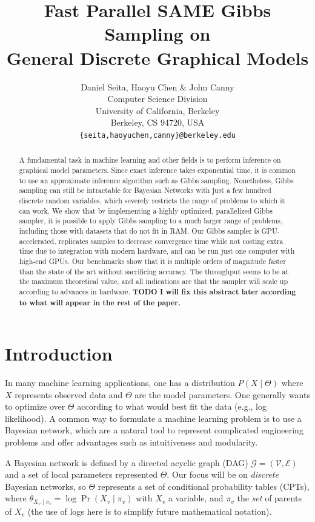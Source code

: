 \documentclass{article} %
\title{Fast Parallel SAME Gibbs Sampling on \\ General Discrete Graphical Models}
\author{Daniel Seita, Haoyu Chen \& John Canny \\
Computer Science Division \\
University of California, Berkeley \\
Berkeley, CS 94720, USA \\
\texttt{\{seita,haoyuchen,canny\}@berkeley.edu}
}
\begin{document}
\maketitle

\begin{abstract}
A fundamental task in machine learning and other fields is to perform inference on graphical model
parameters. Since exact inference takes exponential time, it is common to use an approximate
inference algorithm such as Gibbs sampling. Nonetheless, Gibbs sampling can still be intractable for
Bayesian Networks with just a few hundred discrete random variables, which severely restricts the
range of problems to which it can work. We show that by implementing a highly optimized,
parallelized Gibbs sampler, it is possible to apply Gibbs sampling to a much larger range of
problems, including those with datasets that do not fit in RAM. Our Gibbs sampler is
GPU-accelerated, replicates samples to decrease convergence time while not costing extra time
due to integration with modern hardware, and can be run just one computer with high-end GPUs. Our
benchmarks show that it is multiple orders of magnitude faster than the state of the art without
sacrificing accuracy. The throughput seems to be at the maximum theoretical value, and all
indications are that the sampler will scale up according to advances in hardware. \textbf{TODO I
will fix this abstract later according to what will appear in the rest of the paper.}
\end{abstract}




\section{Introduction}\label{sec:intro}

In many machine learning applications, one has a distribution $P(X \mid \Theta)$ where $X$
represents observed data and $\Theta$ are the model parameters. One generally wants to optimize over
$\Theta$ according to what would best fit the data (e.g., log likelihood). A common way to formulate
a machine learning problem is to use a Bayesian network, which are a natural tool to represent
complicated engineering problems and offer advantages such as intuitiveness and modularity.

A Bayesian network is defined by a directed acyclic graph (DAG) $\mathcal{G} = (\mathcal{V},
\mathcal{E})$ and a set of local parameters represented $\Theta$. Our focus will be on
\emph{discrete} Bayesian networks, so $\Theta$ represents a set of conditional probability tables
(CPTs), where $\theta_{X_v \mid \pi_v} = \log \Pr(X_v \mid \pi_v)$ with $X_v$ a variable, and
$\pi_v$ the \emph{set} of parents of $X_v$ (the use of logs here is to simplify future mathematical
notation).
\end{document}

